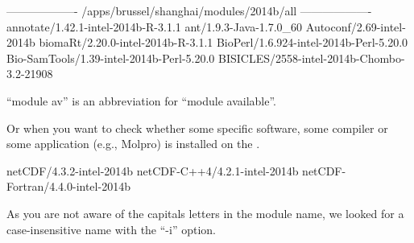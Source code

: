 \begin{prompt}
------------------- /apps/brussel/shanghai/modules/2014b/all -------------------
annotate/1.42.1-intel-2014b-R-3.1.1
ant/1.9.3-Java-1.7.0_60
Autoconf/2.69-intel-2014b
biomaRt/2.20.0-intel-2014b-R-3.1.1
BioPerl/1.6.924-intel-2014b-Perl-5.20.0
Bio-SamTools/1.39-intel-2014b-Perl-5.20.0
BISICLES/2558-intel-2014b-Chombo-3.2-21908
\end{prompt}

``module av'' is an abbreviation for ``module available''.

Or when you want to check whether some specific software, some compiler or some
application (e.g., Molpro) is installed on the \hpc.

\begin{prompt}
netCDF/4.3.2-intel-2014b
netCDF-C++4/4.2.1-intel-2014b
netCDF-Fortran/4.4.0-intel-2014b
\end{prompt}

As you are not aware of the capitals letters in the module name, we looked for
a case-insensitive name with the ``-i'' option.
